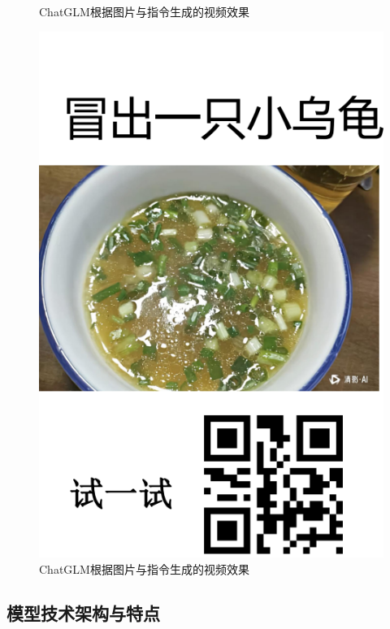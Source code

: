 \begin{figure}[H]
\begin{minipage}[t]{0.35\textwidth}
        \caption{ChatGLM根据图片与指令生成的视频效果}
        \label{fig:chatglm8}
    \end{minipage}
    \hspace{0.05\textwidth}
    \begin{minipage}[t]{0.35\textwidth}
        \centering
        \includegraphics[width=\textwidth]{figures/chapter1/fig10.2.png}
        \caption{ChatGLM根据图片与指令生成的视频效果}
        \label{fig:chatglm9}
    \end{minipage}
\end{figure}

\subsection{模型技术架构与特点}

